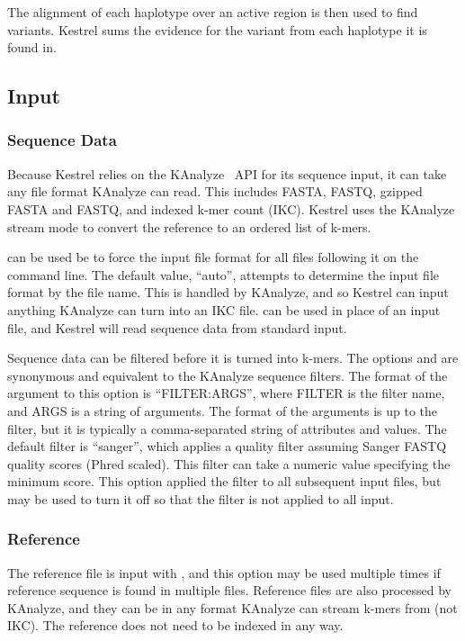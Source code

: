 The alignment of each haplotype over an active region is then used to find variants. Kestrel sums the evidence for the variant from each haplotype it is found in.


\subsection{Input}
\label{sec.process.input}

\subsubsection{Sequence Data}
\label{sec.process.input.seq}
Because Kestrel relies on the KAnalyze~\cite{Audano2014} API for its sequence input, it can take any file format KAnalyze can read. This includes FASTA, FASTQ, gzipped FASTA and FASTQ, and indexed k-mer count (IKC). Kestrel uses the KAnalyze stream mode to convert the reference to an ordered list of k-mers.

 can be used be to force the input file format for all files following it on the command line. The default value, ``auto'', attempts to determine the input file format by the file name. This is handled by KAnalyze, and so Kestrel can input anything KAnalyze can turn into an IKC file.  can be used in place of an input file, and Kestrel will read sequence data from standard input.

Sequence data can be filtered before it is turned into k-mers. The options  and  are synonymous and equivalent to the KAnalyze sequence filters. The format of the argument to this option is ``FILTER:ARGS'', where FILTER is the filter name, and ARGS is a string of arguments. The format of the arguments is up to the filter, but it is typically a comma-separated string of attributes and values. The default filter is ``sanger'', which applies a quality filter assuming Sanger FASTQ quality scores (Phred scaled). This filter can take a numeric value specifying the minimum score. This option applied the filter to all subsequent input files, but  may be used to turn it off so that the filter is not applied to all input.

\subsubsection{Reference}
\label{sec.process.input.seq}

The reference file is input with , and this option may be used multiple times if reference sequence is found in multiple files. Reference files are also processed by KAnalyze, and they can be in any format KAnalyze can stream k-mers from (not IKC). The reference does not need to be indexed in any way.

